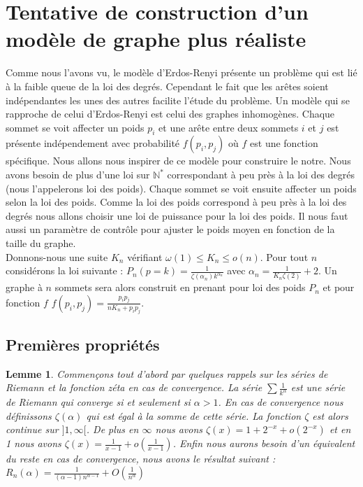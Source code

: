 \documentclass[letterpaper,10pt]{llncs}
\newtheorem{lemme}{Lemme}
\begin{document}
\section{Tentative de construction d'un modèle de graphe plus réaliste}

Comme nous l'avons vu, le modèle d'Erdos-Renyi présente un problème qui est lié à la faible queue de la loi des degrés. Cependant le fait que les arêtes soient indépendantes les unes des autres facilite l'étude du problème. Un modèle qui se rapproche de celui d'Erdos-Renyi est celui des graphes inhomogènes. Chaque sommet se voit affecter un poids $p_i$ et une arête entre deux sommets $i$ et $j$ est présente indépendement avec probabilité $f(p_i,p_j)$ où $f$ est une fonction spécifique. Nous allons nous inspirer de ce modèle pour construire le notre. Nous avons besoin de plus d'une loi sur $\mathbb{N^*}$ correspondant à peu près à la loi des degrés (nous l'appelerons loi des poids). Chaque sommet se voit ensuite affecter un poids selon la loi des poids. Comme la loi des poids correspond à peu près à la loi des degrés nous allons choisir une loi de puissance pour la loi des poids. Il nous faut aussi un paramètre de contrôle pour ajuster le poids moyen en fonction de la taille du graphe. \\
Donnons-nous une suite $K_n$ vérifiant $\omega(1) \leq K_n \leq o(n)$. Pour tout $n$ considérons la loi suivante : $P_n(p = k) = \frac{1}{\zeta(\alpha_n)k^{\alpha_n}}$ avec $\alpha_n = \frac{1}{K_n \zeta(2)} + 2$. Un graphe à $n$ sommets sera alors construit en prenant pour loi des poids $P_n$ et pour fonction $f$ $f(p_i,p_j) = \frac{p_i p_j}{n K_n + p_i p_j}$.

\subsection{Premières propriétés}

\begin{lemme}
Commençons tout d'abord par quelques rappels sur les séries de Riemann et la fonction zéta en cas de convergence. La série $\sum \frac{1}{k^\alpha}$ est une série de Riemann qui converge si et seulement si $\alpha > 1$. En cas de convergence nous définissons $\zeta(\alpha)$ qui est égal à la somme de cette série. La fonction $\zeta$ est alors continue sur $]1,\infty[$. De plus en $\infty$ nous avons $\zeta(x) = 1 + 2^{-x} + o(2^{-x})$ et en 1 nous avons $\zeta(x) = \frac{1}{x-1} + o(\frac{1}{x-1})$. Enfin nous aurons besoin d'un équivalent du reste en cas de convergence, nous avons le résultat suivant : $R_n(\alpha) = \frac{1}{(\alpha - 1) n^{\alpha -1}} + O(\frac{1}{n^\alpha})$
\end{lemme}
\end{document}
